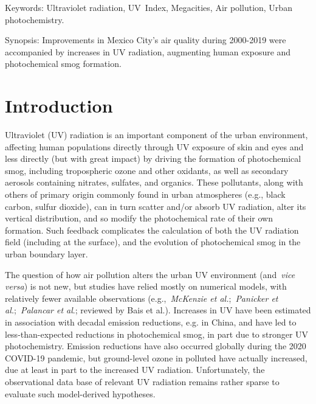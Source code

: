 \documentclass[10pt]{article}
\begin{document}
\sloppy


Keywords: Ultraviolet radiation, UV~Index, Megacities, Air pollution,
Urban photochemistry.

Synopsis: Improvements in Mexico City's air quality during 2000-2019
were accompanied by increases in UV radiation, augmenting human exposure
and photochemical smog formation.

\section*{Introduction}

 {\label{123750}}

Ultraviolet (UV) radiation is an important component of the urban
environment, affecting human populations directly through UV exposure of
skin and eyes \cite{Taylor_1988,Varotsos_1997,Lucas_2019} and less directly (but with great
impact) by driving the formation of photochemical smog, including
tropospheric ozone and other oxidants, as well as secondary aerosols
containing nitrates, sulfates, and organics.\cite{LEIGHTON_1961,Seinfeld_1998,Finlayson_Pitts_2000} These
pollutants, along with others of primary origin commonly found in urban
atmospheres (e.g., black carbon, sulfur dioxide), can in turn scatter
and/or absorb UV radiation, alter its vertical distribution, and so
modify the photochemical rate of their own formation. Such feedback
complicates the calculation of both the UV radiation field (including at
the surface), and the evolution of photochemical smog in the urban
boundary layer.

The question of how air pollution alters the urban UV environment
(and~\emph{vice versa}) is not new, but studies have relied mostly on
numerical models,\cite{Liu_1991,Sabziparvar_1998,Madronich_2011} with relatively fewer available
observations (e.g.,~\emph{McKenzie et
  al.\cite{McKenzie_2008}};~\emph{Panicker et
  al.}\cite{Panicker_2009};~\emph{Palancar et al}.\cite{Palancar_2013};
reviewed by Bais et al.\cite{Bais_2015}). Increases in UV have been
estimated in association with decadal emission reductions, e.g. in
China,\cite{Hollaway_2019,Li_2018,Wang_2020} and have led to less-than-expected reductions
in photochemical smog, in part due to stronger UV
photochemistry.\cite{Wang_2019,Gao_2020,Ma_2020} Emission reductions have also occurred
globally during the 2020 COVID-19 pandemic,\cite{Bauwens_2020,Venter_2020} but
ground-level ozone in polluted have actually
increased,\cite{Shi_2020,Le_2020} due at least in part to the increased UV
radiation. Unfortunately, the observational data base of relevant UV
radiation remains rather sparse to evaluate such model-derived
hypotheses.~~
\end{document}
